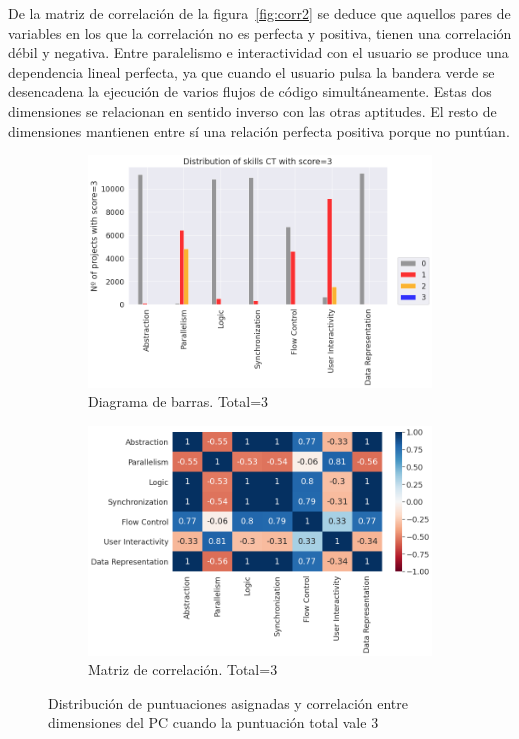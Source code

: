 \documentclass[a4paper, 12pt]{book}
\begin{document}
De la matriz de correlación de la figura~\ref{fig:corr2} se deduce que aquellos pares de variables en los que la correlación no es perfecta y positiva, tienen una correlación débil y negativa. Entre paralelismo e interactividad con el usuario se produce una dependencia lineal perfecta, ya que cuando el usuario pulsa la bandera verde se desencadena la ejecución de varios flujos de código simultáneamente. Estas dos dimensiones se relacionan en sentido inverso con las otras aptitudes. El resto de dimensiones mantienen entre sí una relación perfecta positiva porque no puntúan. 

\begin{figure}[H]
    \centering
    \begin{subfigure}[h]{.49\textwidth} 
        \includegraphics[width=\textwidth]{img/distribucion_3_Scratch}
        \caption{Diagrama de barras. Total=3}
        \label{fig:total3}
    \end{subfigure}       
    \begin{subfigure}[h]{.49\textwidth} 
        \includegraphics[width=\textwidth]{img/corr_3_Scratch}
        \caption{Matriz de correlación. Total=3}
        \label{fig:corr3}
    \end{subfigure}
     \caption{Distribución de puntuaciones asignadas y correlación entre dimensiones del PC cuando la puntuación total vale 3}
\end{figure}
\end{document}
